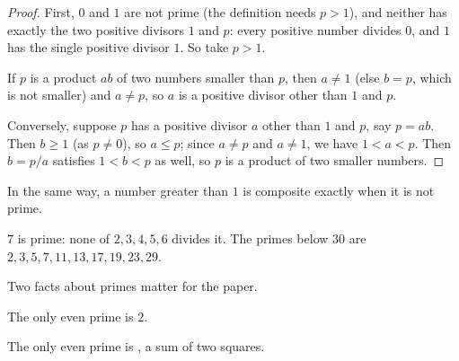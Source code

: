 \bpush\begin{proof}

First, \(0\) and \(1\) are not prime (the definition needs \(p > 1\)),
and neither has exactly the two positive divisors \(1\) and \(p\): every
positive number divides \(0\), and \(1\) has the single positive divisor
\(1\). So take \(p > 1\).

If \(p\) is a product \(ab\) of two numbers smaller than \(p\), then
\(a \ne 1\) (else \(b = p\), which is not smaller) and \(a \ne p\), so
\(a\) is a positive divisor other than \(1\) and \(p\).

Conversely, suppose \(p\) has a positive divisor \(a\) other than \(1\)
and \(p\), say \(p = ab\). Then \(b \ge 1\) (as \(p \ne 0\)), so
\(a \le p\); since \(a \ne p\) and \(a \ne 1\), we have \(1 < a < p\).
Then \(b = p / a\) satisfies \(1 < b < p\) as well, so \(p\) is a
product of two smaller numbers.

\end{proof}\bpop

In the same way, a number greater than \(1\) is composite exactly when
it is not prime.

\bpush\begin{bexample}

\(7\) is prime:
none of \(2, 3, 4, 5, 6\) divides it. The primes below \(30\) are
\(2, 3, 5, 7, 11, 13, 17, 19, 23, 29\).

\end{bexample}\bpop

Two facts about primes matter for the paper.

\bpush\begin{btheorem}\label{thm-only-even-prime}

The only even prime is \(2\).

\end{btheorem}\bpop

\bpush\begin{bquote}

The only even prime is
,
a sum of two squares.

\end{bquote}\bpop

